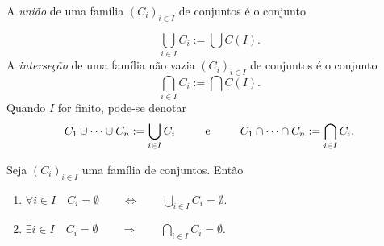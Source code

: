 \begin{defi}
A \emph{união} de uma família $(C_i)_{i \in I}$ de conjuntos é o conjunto
\end{defi}
	\begin{equation*}
	\bigcup_{i \in I} C_i := \bigcup C(I).
	\end{equation*}
A \emph{interseção} de uma família não vazia $(C_i)_{i \in I}$ de conjuntos é o conjunto
	\begin{equation*}
	\bigcap_{i \in I} C_i := \bigcap C(I).
	\end{equation*}
\noindent
Quando $I$ for finito, pode-se denotar
	\begin{equation*}
	C_1 \cup \cdots \cup C_n := \bigcup_{i \in I} C_i \qquad \text{\ \ e\ \ } \qquad C_1 \cap \cdots \cap C_n := \bigcap_{i \in I} C_i.
	\end{equation*}
	
\begin{prop}
	Seja $(C_i)_{i \in I}$ uma família de conjuntos. Então
	\begin{enumerate}
	\item $\forall i \in I \quad C_i = \emptyset \qquad \Leftrightarrow \qquad \displaystyle \bigcup_{i \in I} C_i = \emptyset$.
	
	\item $\displaystyle \exists i \in I \quad C_i = \emptyset \qquad \Rightarrow \qquad \bigcap_{i \in I} C_i = \emptyset$.
	\end{enumerate}
\end{prop}

